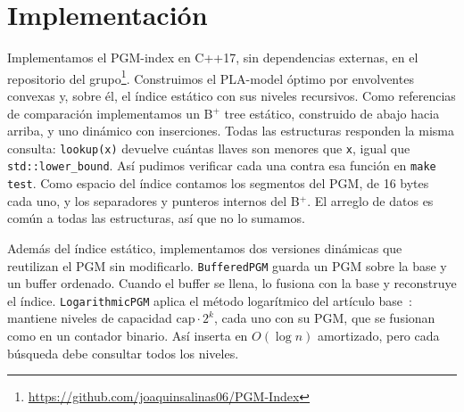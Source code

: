 \section{Implementación}
\label{sec:impl}

Implementamos el PGM-index en C++17, sin dependencias externas, en el repositorio del
grupo\footnote{\url{https://github.com/joaquinsalinas06/PGM-Index}}. Construimos el PLA-model
óptimo por envolventes convexas y, sobre él, el índice estático con sus niveles recursivos. Como
referencias de comparación implementamos un B$^+$ tree estático, construido de abajo hacia
arriba, y uno dinámico con inserciones. Todas las estructuras responden la misma consulta: \texttt{lookup(x)}
devuelve cuántas llaves son menores que \texttt{x}, igual que \texttt{std::lower\_bound}. Así
pudimos verificar cada una contra esa función en \texttt{make test}. Como espacio del índice contamos los segmentos del PGM, de 16
bytes cada uno, y los separadores y punteros internos del B$^+$. El arreglo de datos es común a
todas las estructuras, así que no lo sumamos.

\label{sec:impl-dyn}
Además del índice estático, implementamos dos versiones dinámicas que reutilizan el PGM sin
modificarlo. \texttt{BufferedPGM} guarda un PGM sobre la base y un
buffer ordenado. Cuando el buffer se llena, lo fusiona con la base y reconstruye el índice.
\texttt{LogarithmicPGM} aplica el método logarítmico del artículo
base~\cite{ferragina2020pgm}: mantiene niveles de capacidad $\text{cap}\cdot 2^k$, cada uno con su
PGM, que se fusionan como en un contador binario. Así inserta en $O(\log n)$ amortizado, pero
cada búsqueda debe consultar todos los niveles.
